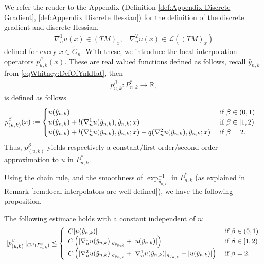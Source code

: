 \documentclass[11pt,reqno]{amsart}
\numberwithin{equation}{section}
\theoremstyle{plain}
\def\L{\mathcal L}
\begin{document}
  We refer the reader to the Appendix (Definition \ref{def:Appendix Discrete Gradient}, \ref{def:Appendix Discrete Hessian}) for the definition of the discrete gradient and discrete Hessian,
  \begin{align*}
    \nabla^1_n u(x) \in (TM)_x,\;\;\;\nabla^2_n u(x) \in \L((TM)_x)
  \end{align*}
  defined for every $x \in \tilde G_n$. With these, we introduce the local interpolation operators $p^\beta_{u,k}(x)$. These are real valued functions defined as follows, recall $\hat y_{n,k}$ from \eqref{eqWhitney:DefOfYnkHat}, then
  \begin{align*}
    p^\beta_{u,k}: P_{n,k}^* \to \mathbb{R},
  \end{align*}	  
  is defined as follows
  \begin{align}
      p^\beta_{(u,k)}(x) & := 
	  \begin{cases} 
        u(\hat y_{n,k}) & \textnormal{ if } \beta \in(0,1)\\	 
        u(\hat y_{n,k})+l(\nabla^1_n u (\hat y_{n,k}),\hat y_{n,k};x) & \textnormal{ if } \beta \in [1,2)\\
        u(\hat y_{n,k})+l(\nabla^1_n u(\hat y_{n,k}), \hat y_{n,k};x)+q(\nabla^2_n u(\hat y_{n,k}), \hat y_{n,k};x) & \textnormal{ if } \beta = 2.
      \end{cases}\label{eqWhitney:DefOfPbetaU}     
  \end{align}
  Thus, $p^\beta_{(u,k)}$ yields respectively a constant/first order/second order approximation to $u$ in $P_{n,k}^*$.
  
  Using the chain rule, and the smoothness of $\exp_{\hat y_{n,k}}^{-1}$  in $P_{n,k}^*$ (as explained in Remark \ref{rem:local interpolators are well defined}), we have the following proposition.
  \begin{prop}\label{prop: local interpolation operators}
    The following estimate holds with a constant independent of $n$:
    \begin{align*}
      \|p^\beta_{(u,k)}\|_{C^{\beta}(P_{n,k}^*)} \leq \left \{ \begin{array}{ll}
        C |u(\hat y_{n,k})|  & \textnormal{ if } \beta \in (0,1) \\	  
        C \left ( | \nabla^1_n u(\hat y_{n,k})|_{g_{\hat y_{n,k}}} + |u(\hat y_{n,k})|  \right ) & \textnormal{ if } \beta \in [1,2)\\
	C \left ( | \nabla^2_n u(\hat y_{n,k})|_{g_{\hat y_{n,k}}}+ | \nabla^1_n u(\hat y_{n,k})|_{g_{\hat y_{n,k}}} + |u(\hat y_{n,k})| \right ) & \textnormal{ if } \beta=2.\\
      \end{array}\right.
    \end{align*}		
  \end{prop}
\end{document}

